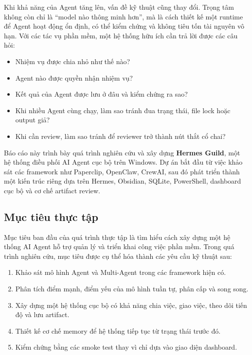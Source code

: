 \documentclass[12pt,a4paper]{article}
\begin{document}
Khi khả năng của Agent tăng lên, vấn đề kỹ thuật cũng thay đổi. Trọng tâm không còn chỉ là ``model nào thông minh hơn'', mà là cách thiết kế một runtime để Agent hoạt động ổn định, có thể kiểm chứng và không tiêu tốn tài nguyên vô hạn. Với các tác vụ phần mềm, một hệ thống hữu ích cần trả lời được các câu hỏi:

\begin{itemize}
    \item Nhiệm vụ được chia nhỏ như thế nào?
    \item Agent nào được quyền nhận nhiệm vụ?
    \item Kết quả của Agent được lưu ở đâu và kiểm chứng ra sao?
    \item Khi nhiều Agent cùng chạy, làm sao tránh đua trạng thái, file lock hoặc output giả?
    \item Khi cần review, làm sao tránh để reviewer trở thành nút thắt cổ chai?
\end{itemize}

Báo cáo này trình bày quá trình nghiên cứu và xây dựng \textbf{Hermes Guild}, một hệ thống điều phối AI Agent cục bộ trên Windows. Dự án bắt đầu từ việc khảo sát các framework như Paperclip, OpenClaw, CrewAI, sau đó phát triển thành một kiến trúc riêng dựa trên Hermes, Obsidian, SQLite, PowerShell, dashboard cục bộ và cơ chế artifact review.

\subsection{Mục tiêu thực tập}

Mục tiêu ban đầu của quá trình thực tập là tìm hiểu cách xây dựng một hệ thống AI Agent hỗ trợ quản lý và triển khai công việc phần mềm. Trong quá trình nghiên cứu, mục tiêu được cụ thể hóa thành các yêu cầu kỹ thuật sau:

\begin{enumerate}
    \item Khảo sát mô hình Agent và Multi-Agent trong các framework hiện có.
    \item Phân tích điểm mạnh, điểm yếu của mô hình tuần tự, phân cấp và song song.
    \item Xây dựng một hệ thống cục bộ có khả năng chia việc, giao việc, theo dõi tiến độ và lưu artifact.
    \item Thiết kế cơ chế memory để hệ thống tiếp tục từ trạng thái trước đó.
    \item Kiểm chứng bằng các smoke test thay vì chỉ dựa vào giao diện dashboard.
\end{enumerate}
\end{document}
